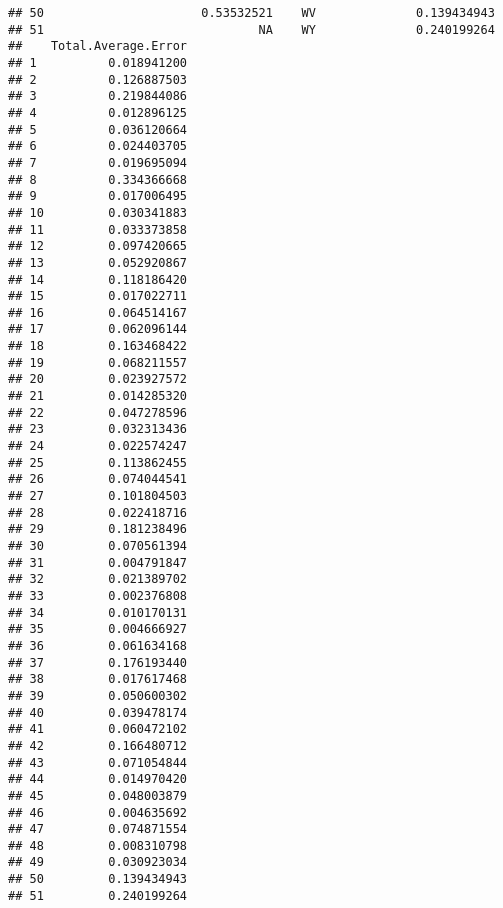 \documentclass{article}\usepackage[]{graphicx}\usepackage[]{color}
\makeatletter
\newenvironment{kframe}{%
 \def\at@end@of@kframe{}%
 \ifinner\ifhmode%
  \def\at@end@of@kframe{\end{minipage}}%
  \begin{minipage}{\columnwidth}%
 \fi\fi%
 \def\FrameCommand##1{\hskip\@totalleftmargin \hskip-\fboxsep
 \colorbox{shadecolor}{##1}\hskip-\fboxsep
     \hskip-\linewidth \hskip-\@totalleftmargin \hskip\columnwidth}%
 \MakeFramed {\advance\hsize-\width
   \@totalleftmargin\z@ \linewidth\hsize
   \@setminipage}}%
 {\par\unskip\endMakeFramed%
 \at@end@of@kframe}
\newenvironment{knitrout}{}{} %
\makeatother
\begin{document}
\begin{knitrout}
\begin{kframe}
\begin{verbatim}
## 50                      0.53532521    WV              0.139434943
## 51                              NA    WY              0.240199264
##    Total.Average.Error
## 1          0.018941200
## 2          0.126887503
## 3          0.219844086
## 4          0.012896125
## 5          0.036120664
## 6          0.024403705
## 7          0.019695094
## 8          0.334366668
## 9          0.017006495
## 10         0.030341883
## 11         0.033373858
## 12         0.097420665
## 13         0.052920867
## 14         0.118186420
## 15         0.017022711
## 16         0.064514167
## 17         0.062096144
## 18         0.163468422
## 19         0.068211557
## 20         0.023927572
## 21         0.014285320
## 22         0.047278596
## 23         0.032313436
## 24         0.022574247
## 25         0.113862455
## 26         0.074044541
## 27         0.101804503
## 28         0.022418716
## 29         0.181238496
## 30         0.070561394
## 31         0.004791847
## 32         0.021389702
## 33         0.002376808
## 34         0.010170131
## 35         0.004666927
## 36         0.061634168
## 37         0.176193440
## 38         0.017617468
## 39         0.050600302
## 40         0.039478174
## 41         0.060472102
## 42         0.166480712
## 43         0.071054844
## 44         0.014970420
## 45         0.048003879
## 46         0.004635692
## 47         0.074871554
## 48         0.008310798
## 49         0.030923034
## 50         0.139434943
## 51         0.240199264
\end{verbatim}
\end{kframe}
\end{knitrout}
\end{document}
